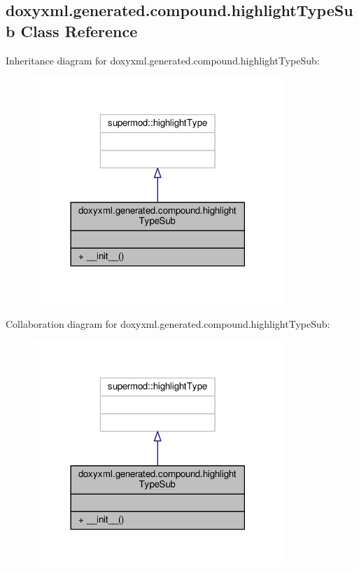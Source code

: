 \subsection{doxyxml.\+generated.\+compound.\+highlight\+Type\+Sub Class Reference}
\label{classdoxyxml_1_1generated_1_1compound_1_1highlightTypeSub}


Inheritance diagram for doxyxml.\+generated.\+compound.\+highlight\+Type\+Sub\+:
\nopagebreak
\begin{figure}[H]
\begin{center}
\leavevmode
\includegraphics[width=266pt]{da/d02/classdoxyxml_1_1generated_1_1compound_1_1highlightTypeSub__inherit__graph}
\end{center}
\end{figure}


Collaboration diagram for doxyxml.\+generated.\+compound.\+highlight\+Type\+Sub\+:
\nopagebreak
\begin{figure}[H]
\begin{center}
\leavevmode
\includegraphics[width=266pt]{d6/d9f/classdoxyxml_1_1generated_1_1compound_1_1highlightTypeSub__coll__graph}
\end{center}
\end{figure}
